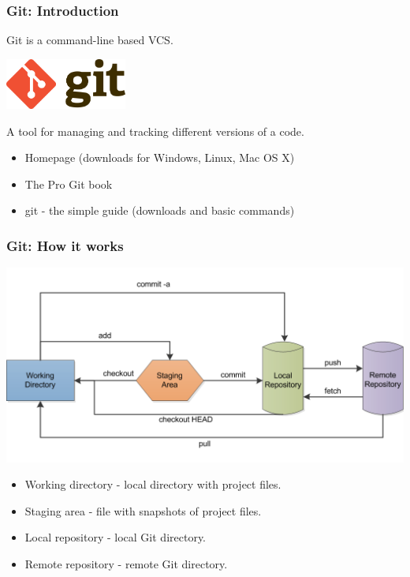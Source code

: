 \documentclass{fenicscourse}
\begin{document}
\begin{frame}
  \frametitle{Git: Introduction}

  Git is a command-line based VCS.

  \begin{center}
    \includegraphics[width=0.3\textwidth]{png/git_logo.png}
  \end{center}

  A tool for managing and tracking different versions of a code.

  \bigskip

  \begin{itemize}
    \item Homepage (downloads for Windows, Linux, Mac OS X) \\
    \item The Pro Git book \\
    \item git - the simple guide (downloads and basic commands)\\
  \end{itemize}

\end{frame}

\begin{frame}
  \frametitle{Git: How it works}

  \begin{center}
    \includegraphics[width=\textwidth]{png/git_flowchart4.png}
  \end{center}

  \begin{itemize}
    \item Working directory - local directory with project files.
     \item Staging area - file with snapshots of project files.
     \item Local repository - local Git directory.
     \item Remote repository - remote Git directory.
  \end{itemize}
\end{frame}
\end{document}
